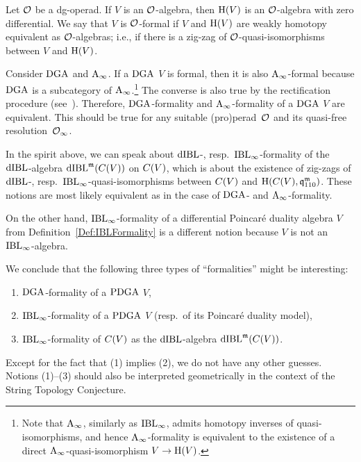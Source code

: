 \documentclass[\MainFolder/Text.tex]{subfiles}
\begin{document}
\begin{Remark}\label{Rem:Intfor}
Let $\mathcal{O}$ be a dg-operad. If $V$ is an $\mathcal{O}$-algebra, then $\mathrm{H}(V)$ is an $\mathcal{O}$-algebra with zero differential. We say that $V$ is $\mathcal{O}$-formal if $V$ and $\mathrm{H}(V)$ are weakly homotopy equivalent as $\mathcal{O}$-algebras; i.e., if there is a zig-zag of $\mathcal{O}$-quasi-isomorphisms between $V$ and $\mathrm{H}(V)$.

Consider $\mathrm{DGA}$ and $\mathrm{A}_\infty$. If a $\mathrm{DGA}$ $V$ is formal, then it is also $\mathrm{A}_\infty$-formal because $\mathrm{DGA}$ is a subcategory of $\mathrm{A}_\infty$.\footnote{Note that $\mathrm{A}_\infty$, similarly as $\mathrm{IBL}_\infty$, admits homotopy inverses of quasi-isomorphisms, and hence $\mathrm{A}_\infty$-formality is equivalent to the existence of a direct $\mathrm{A}_\infty$-quasi-isomorphism $V \rightarrow \mathrm{H}(V)$.} The converse is also true by the rectification procedure (see~\cite{MSE2719961}). Therefore, $\mathrm{DGA}$-formality and $\mathrm{A}_\infty$-formality of a $\mathrm{DGA}$ $V$ are equivalent. This should be true for any suitable (pro)perad~$\mathcal{O}$ and its quasi-free resolution~$\mathcal{O}_\infty$.

In the spirit above, we can speak about $\mathrm{dIBL}$-, resp.~$\mathrm{IBL}_\infty$-formality of the $\mathrm{dIBL}$-algebra $\mathrm{dIBL}^{\mathfrak{m}}(C(V))$ on $C(V)$, which is about the existence of zig-zags of $\mathrm{dIBL}$-, resp.~$\mathrm{IBL}_\infty$-quasi-isomorphisms between $C(V)$ and $\mathrm{H}(C(V),\mathfrak{q}_{110}^{\mathfrak{m}})$. These notions are most likely equivalent as in the case of $\mathrm{DGA}$- and $\mathrm{A}_\infty$-formality.

On the other hand, $\mathrm{IBL}_\infty$-formality of a differential Poincar\'e duality algebra $V$ from Definition~\ref{Def:IBLFormality} is a different notion because $V$ is not an $\mathrm{IBL}_\infty$-algebra.

We conclude that the following three types of ``formalities'' might be interesting: 
\begin{enumerate}[label=\arabic*)]
 \item $\mathrm{DGA}$-formality of a $\mathrm{PDGA}$ $V$, 
 \item $\mathrm{IBL}_\infty$-formality of a $\mathrm{PDGA}$ $V$ (resp.~of its Poincar\'e duality model),
 \item $\mathrm{IBL}_\infty$-formality of $C(V)$ as the $\mathrm{dIBL}$-algebra $\mathrm{dIBL}^{\mathfrak{m}}(C(V))$.
\end{enumerate}
Except for the fact that (1) implies (2), we do not have any other guesses. Notions (1)--(3) should also be interpreted geometrically in the context of the String Topology Conjecture.
\end{Remark}
\end{document}
